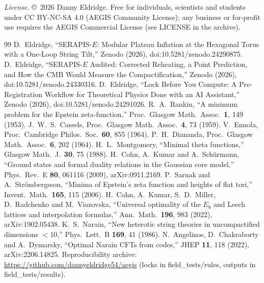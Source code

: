 \documentclass[aps,prd,twocolumn,superscriptaddress,nofootinbib,showkeys]{revtex4-2}
\begin{document}
\emph{License.} \copyright~2026 Danny Eldridge. Free for individuals, scientists and students under CC BY-NC-SA 4.0 (AEGIS Community License); any business or for-profit use requires the AEGIS Commercial License (see LICENSE in the archive).

\begin{thebibliography}{99}
 D.~Eldridge, ``SERAPIS-$E$: Modular Plateau Inflation at the Hexagonal Torus with a One-Loop String Tilt,'' Zenodo (2026), doi:10.5281/zenodo.24290875.
 D.~Eldridge, ``SERAPIS-$E$ Audited: Corrected Reheating, a Point Prediction, and How the CMB Would Measure the Compactification,'' Zenodo (2026), doi:10.5281/zenodo.24330316.
 D.~Eldridge, ``Lock Before You Compute: A Pre-Registration Workflow for Theoretical Physics Done with an AI Assistant,'' Zenodo (2026), doi:10.5281/zenodo.24291026.
 R.~A.~Rankin, ``A minimum problem for the Epstein zeta-function,'' Proc.\ Glasgow Math.\ Assoc.\ \textbf{1}, 149 (1953).
 J.~W.~S.~Cassels, Proc.\ Glasgow Math.\ Assoc.\ \textbf{4}, 73 (1959).
 V.~Ennola, Proc.\ Cambridge Philos.\ Soc.\ \textbf{60}, 855 (1964).
 P.~H.~Diananda, Proc.\ Glasgow Math.\ Assoc.\ \textbf{6}, 202 (1964).
 H.~L.~Montgomery, ``Minimal theta functions,'' Glasgow Math.\ J.\ \textbf{30}, 75 (1988).
 H.~Cohn, A.~Kumar and A.~Sch\"urmann, ``Ground states and formal duality relations in the Gaussian core model,'' Phys.\ Rev.\ E \textbf{80}, 061116 (2009), arXiv:0911.2169.
 P.~Sarnak and A.~Str\"ombergsson, ``Minima of Epstein's zeta function and heights of flat tori,'' Invent.\ Math.\ \textbf{165}, 115 (2006).
 H.~Cohn, A.~Kumar, S.~D.~Miller, D.~Radchenko and M.~Viazovska, ``Universal optimality of the $E_8$ and Leech lattices and interpolation formulas,'' Ann.\ Math.\ \textbf{196}, 983 (2022), arXiv:1902.05438.
 K.~S.~Narain, ``New heterotic string theories in uncompactified dimensions $<10$,'' Phys.\ Lett.\ B \textbf{169}, 41 (1986).
 N.~Angelinos, D.~Chakraborty and A.~Dymarsky, ``Optimal Narain CFTs from codes,'' JHEP \textbf{11}, 118 (2022), arXiv:2206.14825.
 Reproducibility archive: \url{https://github.com/dannyeldridge54/aegis} (locks in field\_tests/rules, outputs in field\_tests/results).
\end{thebibliography}
\end{document}
